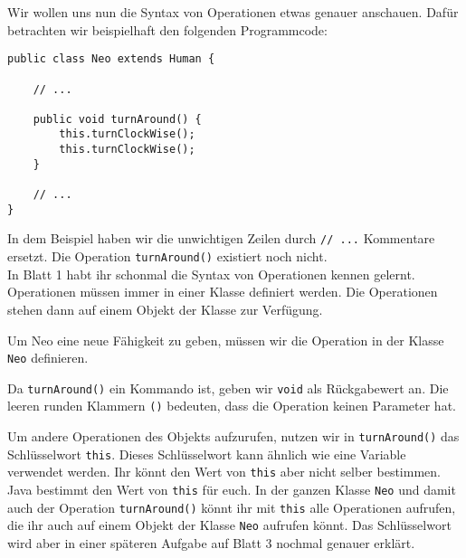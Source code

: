 \begin{Infobox}
    Wir wollen uns nun die Syntax von Operationen etwas genauer anschauen. 
    Dafür betrachten wir beispielhaft den folgenden Programmcode:

    \begin{lstlisting}[numbers=none]
public class Neo extends Human {

    // ...

    public void turnAround() {
        this.turnClockWise();
        this.turnClockWise();
    }

    // ...
}
    \end{lstlisting}

    In dem Beispiel haben wir die unwichtigen Zeilen durch \lstinline{// ...} Kommentare ersetzt.
    Die Operation \lstinline{turnAround()} existiert noch nicht.\\

    In Blatt 1 habt ihr schonmal die Syntax von Operationen kennen gelernt.
    Operationen müssen immer in einer Klasse definiert werden.
    Die Operationen stehen dann auf einem Objekt der Klasse zur Verfügung.

    Um Neo eine neue Fähigkeit zu geben, müssen wir die Operation in der Klasse \lstinline{Neo} definieren.

    Da \lstinline{turnAround()} ein Kommando ist, geben wir \lstinline{void} als Rückgabewert an.
    Die leeren runden Klammern \lstinline{()} bedeuten, dass die Operation keinen Parameter hat.

    Um andere Operationen des Objekts aufzurufen, nutzen wir in \lstinline{turnAround()} das Schlüsselwort \lstinline{this}.
    Dieses Schlüsselwort kann ähnlich wie eine Variable verwendet werden.
    Ihr könnt den Wert von \lstinline{this} aber nicht selber bestimmen.
    Java bestimmt den Wert von \lstinline{this} für euch.
    In der ganzen Klasse \lstinline{Neo} und damit auch der Operation \lstinline{turnAround()} könnt ihr mit \lstinline{this} alle Operationen aufrufen, die ihr auch auf einem Objekt der Klasse \lstinline{Neo} aufrufen könnt.
    Das Schlüsselwort wird aber in einer späteren Aufgabe auf Blatt 3 nochmal genauer erklärt.

\end{Infobox}


